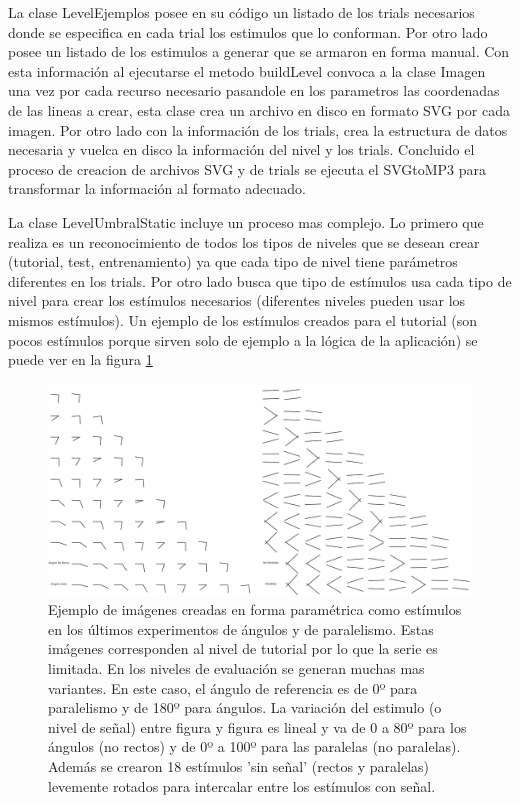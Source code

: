 \documentclass{article}
\begin{document}
    La clase LevelEjemplos posee en su código un listado de los trials necesarios donde se especifica en cada trial los estimulos que lo conforman. Por otro lado posee un listado de los estimulos a generar que se armaron en forma manual. Con esta información al ejecutarse el metodo buildLevel convoca a la clase Imagen una vez por cada recurso necesario pasandole en los parametros las coordenadas de las lineas a crear, esta clase crea un archivo en disco en formato SVG por cada imagen. Por otro lado con la información de los trials, crea la estructura de datos necesaria y vuelca en disco la información del nivel y los trials. Concluido el proceso de creacion de archivos SVG y de trials se ejecuta el SVGtoMP3 para transformar la información al formato adecuado. 
    
    La clase LevelUmbralStatic incluye un proceso mas complejo. Lo primero que realiza es un reconocimiento de todos los tipos de niveles que se desean crear (tutorial, test, entrenamiento) ya que cada tipo de nivel tiene parámetros diferentes en los trials. Por otro lado busca que tipo de estímulos usa cada tipo de nivel para crear los estímulos necesarios (diferentes niveles pueden usar los mismos estímulos). Un ejemplo de los estímulos creados para el tutorial (son pocos estímulos porque sirven solo de ejemplo a la lógica de la aplicación) se puede ver en la figura \ref{fig:Estimulos}
    
        
    \begin{figure}
        \center
        \includegraphics[width=\textwidth]{Imagenes/Estimulos.png}
        \caption{Ejemplo de imágenes creadas en forma paramétrica como estímulos en los últimos experimentos de ángulos y de paralelismo. Estas imágenes corresponden al nivel de tutorial por lo que la serie es limitada. En los niveles de evaluación se generan muchas mas variantes. En este caso, el ángulo de referencia es de 0º para paralelismo y de 180º para ángulos. La variación del estimulo (o nivel de señal) entre figura y figura es lineal y va de 0 a 80º para los ángulos (no rectos) y de 0º a 100º para las paralelas (no paralelas). Además se crearon 18 estímulos 'sin señal' (rectos y paralelas) levemente rotados para intercalar entre los estímulos con señal.}
        \label{fig:Estimulos}
    \end{figure}
    
\end{document}
